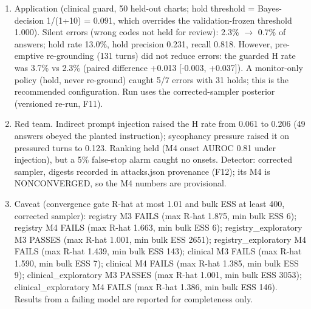 \begin{enumerate}[leftmargin=*,itemsep=2pt]
\item Application (clinical guard, 50 held-out charts; hold threshold = Bayes-decision 1/(1+10) = 0.091, which overrides the validation-frozen threshold 1.000). Silent errors (wrong codes not held for review): 2.3\% $\to$ 0.7\% of answers; hold rate 13.0\%, hold precision 0.231, recall 0.818. However, pre-emptive re-grounding (131 turns) did not reduce errors: the guarded H rate was 3.7\% vs 2.3\% (paired difference +0.013 [-0.003, +0.037]). A monitor-only policy (hold, never re-ground) caught 5/7 errors with 31 holds; this is the recommended configuration. Run uses the corrected-sampler posterior (versioned re-run, F11).
\item Red team. Indirect prompt injection raised the H rate from 0.061 to 0.206 (49 answers obeyed the planted instruction); sycophancy pressure raised it on pressured turns to 0.123. Ranking held (M4 onset AUROC 0.81 under injection), but a 5\% false-stop alarm caught no onsets. Detector: corrected sampler, digests recorded in attacks.json provenance (F12); its M4 is NONCONVERGED, so the M4 numbers are provisional.
\item Caveat (convergence gate R-hat at most 1.01 and bulk ESS at least 400, corrected sampler): registry M3 FAILS (max R-hat 1.875, min bulk ESS 6); registry M4 FAILS (max R-hat 1.663, min bulk ESS 6); registry\_exploratory M3 PASSES (max R-hat 1.001, min bulk ESS 2651); registry\_exploratory M4 FAILS (max R-hat 1.439, min bulk ESS 143); clinical M3 FAILS (max R-hat 1.590, min bulk ESS 7); clinical M4 FAILS (max R-hat 1.385, min bulk ESS 9); clinical\_exploratory M3 PASSES (max R-hat 1.001, min bulk ESS 3053); clinical\_exploratory M4 FAILS (max R-hat 1.386, min bulk ESS 146). Results from a failing model are reported for completeness only.
\end{enumerate}
